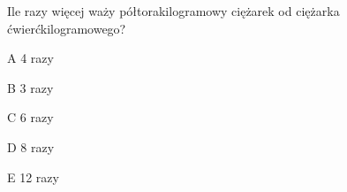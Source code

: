 \begin{tresc}
Ile razy więcej waży półtorakilogramowy ciężarek od ciężarka ćwierćkilogramowego?
\end{tresc}
\begin{wariant}{A} 4 razy \end{wariant}
\begin{wariant}{B} 3 razy \end{wariant}
\begin{wariant}{C} 6 razy \end{wariant}
\begin{wariant}{D} 8 razy \end{wariant}
\begin{wariant}{E} 12 razy \end{wariant}
